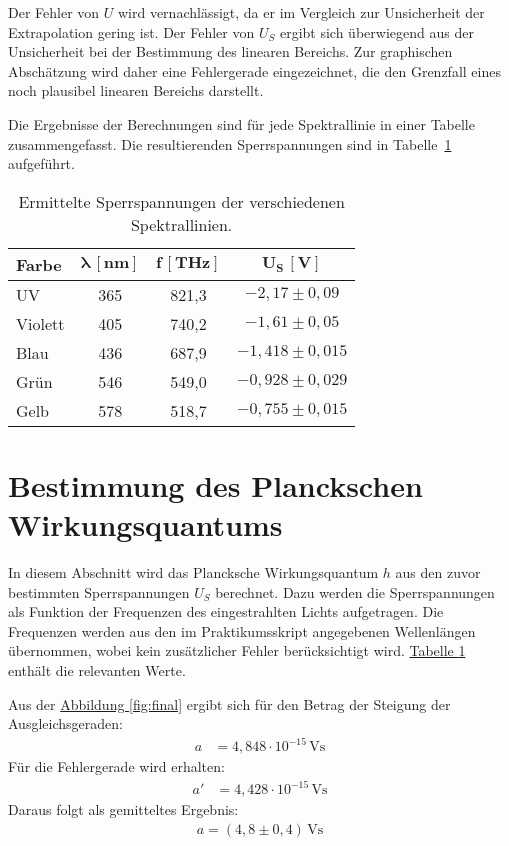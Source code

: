 Der Fehler von $U$ wird vernachlässigt, da er im Vergleich zur Unsicherheit der Extrapolation gering ist. Der Fehler von $U_S$ ergibt sich überwiegend aus der Unsicherheit bei der Bestimmung des linearen Bereichs.
Zur graphischen Abschätzung wird daher eine Fehlergerade eingezeichnet, die den Grenzfall eines noch plausibel linearen Bereichs darstellt.

Die Ergebnisse der Berechnungen sind für jede Spektrallinie in einer Tabelle zusammengefasst.
Die resultierenden Sperrspannungen sind in Tabelle~\ref{tab:sperrspannungen} aufgeführt.

\begin{table}[h!]
\centering
\caption{Ermittelte Sperrspannungen der verschiedenen Spektrallinien.}
\label{tab:sperrspannungen}
\begin{tabular}{lccc}
\toprule
\textbf{Farbe} & $\boldsymbol{\lambda\,[\text{nm}]}$ & $\boldsymbol{f\,[\text{THz}]}$ & $\boldsymbol{U_S\,[\text{V}]}$ \\
\midrule
UV      & 365 & 821,3 & $-2{,}17 \pm 0{,}09$ \\
Violett & 405 & 740,2 & $-1{,}61 \pm 0{,}05$ \\
Blau    & 436 & 687,9 & $-1{,}418 \pm 0{,}015$ \\
Grün    & 546 & 549,0 & $-0{,}928 \pm 0{,}029$ \\
Gelb    & 578 & 518,7 & $-0{,}755 \pm 0{,}015$ \\
\bottomrule
\end{tabular}
\end{table}

\section{Bestimmung des Planckschen Wirkungsquantums}
\label{sec:planck}

In diesem Abschnitt wird das Plancksche Wirkungsquantum $h$ aus den zuvor bestimmten Sperrspannungen $U_S$ berechnet.  
Dazu werden die Sperrspannungen als Funktion der Frequenzen des eingestrahlten Lichts aufgetragen.  
Die Frequenzen werden aus den im Praktikumsskript angegebenen Wellenlängen übernommen, wobei kein zusätzlicher Fehler berücksichtigt wird.  
\hyperref[tab:sperrspannungen]{Tabelle \ref*{tab:sperrspannungen}} enthält die relevanten Werte.  

Aus der \hyperref[fig:final]{Abbildung \ref*{fig:final}} ergibt sich für den Betrag der Steigung der Ausgleichsgeraden:
\begin{align}
a &= 4,848 \cdot 10^{-15}\,\text{Vs} \label{eq:a_messwert}
\end{align}
Für die Fehlergerade wird erhalten:
\begin{align}
a' &= 4{,}428 \cdot 10^{-15}\,\text{Vs} \label{eq:a_fehlergerade}
\end{align}
Daraus folgt als gemitteltes Ergebnis:
\begin{align}
    \boxed{
        a = (4{,}8 \pm 0{,}4)\,\text{Vs} \label{eq:a}
    }
\end{align}


